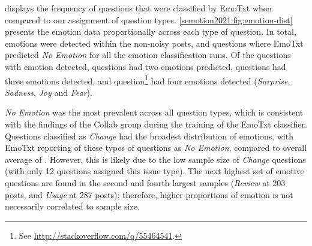 \begin{table}[th]
\caption{Frequency of emotions per question type.}
\label{semotion2021:tab:emotion-freq}
\end{table}

 displays the frequency of questions that were classified by EmoTxt when compared to our assignment of question types. \cref{semotion2021:fig:emotion-dist} presents the emotion data proportionally across each type of question. In total, \SEMNumEmotionsDetected{} emotions were detected within the \SEMNumTotalNonNoisePosts{} non-noisy posts, and \SEMNumNoEmotionsDetected{} questions where EmoTxt predicted  \textit{No Emotion} for all the emotion classification runs.
Of the \SEMNumEmotionsDetected{} questions with emotion detected, \SEMNumQuestionsTwoEmo{} questions had two emotions predicted, \SEMNumQuestionsThreeEmo{} questions had three emotions detected, and \SEMNumQuestionsFourEmo{} question\footnote{See \url{http://stackoverflow.com/q/55464541}.} had four emotions detected (\textit{Surprise}, \textit{Sadness}, \textit{Joy} and \textit{Fear}). 

{\textit{No Emotion} was the most prevalent across all question types}, which is consistent with the findings of the Collab group during the training of the EmoTxt classifier. Questions classified as \textit{ Change} had the broadest distribution of emotions, with EmoTxt reporting \SEMPctNoEmotionAPIChange{} of these types of questions as \textit{No Emotion}, compared to overall average of \SEMPctNoEmotionAverage{}. However, this is likely due to the low sample size of \textit{ Change} questions (with only 12 questions assigned this issue type). The next highest set of emotive questions are found in the second and fourth largest samples (\textit{Review} at 203 posts, and \textit{ Usage} at 287 posts); therefore, higher proportions of emotion is not necessarily correlated to sample size.  

